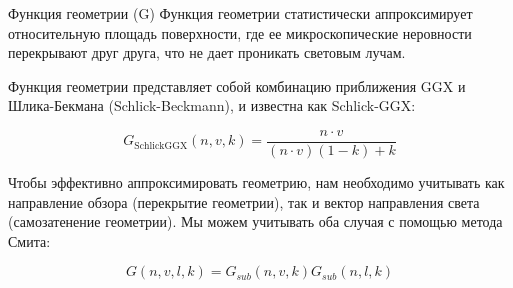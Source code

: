 \documentclass{beamer}
\begin{document}
	\begin{frame}{Функция геометрии (G)}{}
		Функция геометрии статистически аппроксимирует относительную площадь поверхности, где ее микроскопические неровности перекрывают друг друга, что не дает проникать световым лучам.

		Функция геометрии представляет собой комбинацию приближения GGX и Шлика-Бекмана (Schlick-Beckmann), и известна как Schlick-GGX:

		\[
			G_{\text{SchlickGGX}}(n,v,k)=\frac{n\cdot v}{(n\cdot v)(1-k)+k}
			\]



		Чтобы эффективно аппроксимировать геометрию, нам необходимо учитывать как направление обзора (перекрытие геометрии), так и вектор направления света (самозатенение геометрии). Мы можем учитывать оба случая с помощью метода Смита:

		\[
			G(n,v,l,k)=G_{sub}(n,v,k)G_{sub}(n,l,k)
			\]

		
		
	\end{frame}
\end{document}
